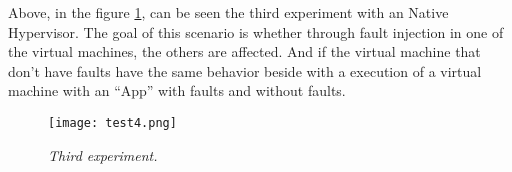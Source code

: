 Above, in the figure \ref{fig:test3}, can be seen the third experiment with an Native Hypervisor. The goal of this scenario is whether through fault injection in one of the virtual machines, the others are affected. And if the virtual machine that don't have faults have the same behavior beside with a execution of a virtual machine with an ``App'' with faults and without faults.



\begin{figure}[!ht]
\begin{center}
\texttt{[image: test4.png]}
\caption{\small \sl Third experiment.\label{fig:test3}}
\end{center}
\end{figure}

